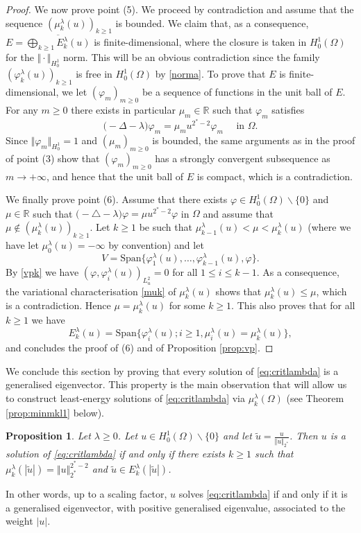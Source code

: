 \documentclass[10pt]{amsart}
\numberwithin{equation}{section}
\newcommand{\R}{\mathbb{R}}
\newcommand{\vp}{\varphi}
\newcommand{\Om}{\Omega}
\newcommand{\mkl}{\mu_{k}^{\lambda}}
\newcommand{\mil}{\mu_{i}^{\lambda}}
\newcommand{\vkl}{\varphi_{k}^{\lambda}}
\newcommand{\vil}{\varphi_{i}^{\lambda}}
\theoremstyle{plain}
\newtheorem{prop}{Proposition}[section]%
\theoremstyle{remark}
\begin{document}
\begin{proof}
We now prove point (5). We proceed by contradiction and assume that the sequence $(\mkl(u))_{k \ge1}$ is bounded. We claim that, as a consequence, $E = \overline{\bigoplus_{k\ge 1} E_k^{\lambda}(u)}$ is finite-dimensional, where the closure is taken in $H^1_0(\Om)$ for the $\Vert \cdot \Vert_{H^1_0}$ norm. This will be an obvious contradiction since the family $(\vkl(u))_{k\ge 1}$ is free in $H^1_0(\Om)$ by \eqref{norma}. To prove that $E$ is finite-dimensional, we let $(\vp_m)_{m \ge0}$ be a sequence of functions in the unit ball of $E$. For any $m \ge0$ there exists in particular $\mu_m \in \R$ such that $\vp_m$ satisfies 
\begin{equation*}
\big( - \Delta - \lambda \big) \vp_m = \mu_m u^{2^*-2} \vp_m \quad \text{ in } \Om.
\end{equation*}
Since $\Vert \vp_m \Vert_{H^1_0} = 1$ and $(\mu_m)_{m \ge 0}$ is bounded, the same arguments as in the proof of point (3) show that $(\vp_m)_{m \ge0}$ has a strongly convergent subsequence as $m \to + \infty$, and hence that the unit ball of $E$ is compact, which is a contradiction. 

We finally prove point (6). Assume that there exists $\vp \in H^1_0(\Om) \backslash \{0\}$ and $\mu \in \R$ such that $\big( - \triangle - \lambda \big) \vp = \mu u^{2^*-2} \vp$ in  $\Om$ and assume that $\mu \not \in (\mkl(u))_{k \ge 1}$. Let $k \ge 1$ be such that $\mu_{k-1}^{\lambda}(u)<  \mu < \mkl(u)$ (where we have let $\mu_0^{\lambda}(u) = - \infty$ by convention) and let 
$$ V = \text{Span} \Big \{ \vp_1^{\lambda}(u), \dots, \vp_{k-1}^{\lambda}(u),\vp \Big \}. $$
By \eqref{vpk} we have $(\vp, \vil(u))_{L^2_u} = 0$ for all $1 \le i \le k-1$. As a consequence, the variational characterisation \eqref{muk} of $\mkl(u)$ shows that $\mkl(u) \le \mu$, which is a contradiction. Hence $\mu = \mkl(u)$ for some $k \ge 1$. This also proves that for all $k \ge 1$ we have 
$$ E_k^{\lambda}(u) = \text{Span} \Big \{  \vil(u) ; i \ge 1, \mil(u) = \mkl(u) \Big \}, $$
and concludes the proof of (6) and of Proposition \ref{prop:vp}. 
\end{proof}

We conclude this section by proving that every solution of \eqref{eq:critlambda} is a generalised eigenvector. This property is the main observation that will allow us to construct least-energy solutions of \eqref{eq:critlambda} via $\mkl(\Om)$ (see Theorem \ref{prop:minmkl1} below). 

\begin{prop} \label{prop:structure:vp}
Let $\lambda \ge 0$. Let $u \in H^1_0(\Om) \backslash \{0\}$ and let $\tilde{u} = \frac{u}{\Vert u \Vert_{2^*}}$. Then $u$ is a solution of \eqref{eq:critlambda} if and only if there exists $k \ge 1$ such that $\mkl(|\tilde{u}|)  = \Vert u \Vert_{2^*}^{2^*-2}$ and $\tilde u \in E_k^{\lambda}(|\tilde{u}|)$. 
\end{prop}
In other words, up to a scaling factor, $u$ solves \eqref{eq:critlambda} if and only if it is a generalised eigenvector, with positive generalised eigenvalue, associated to the weight $|u|$. 
\end{document}
